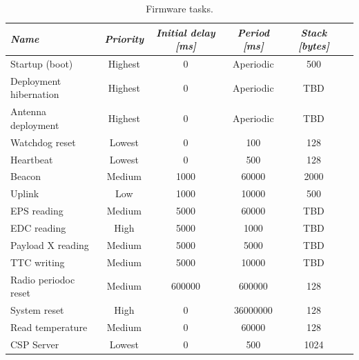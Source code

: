 \begin{table}[!h]
    \centering
    \begin{tabular}{lccccc}
        \toprule[1.5pt]
        \textit{Name}          & \textit{Priority} & \textit{Initial delay [ms]} & \textit{Period [ms]} & \textit{Stack [bytes]} \\
        \midrule
        Startup (boot)         & Highest           & 0                           & Aperiodic            & 500                    \\
        Deployment hibernation & Highest           & 0                           & Aperiodic            & TBD                    \\
        Antenna deployment     & Highest           & 0                           & Aperiodic            & TBD                    \\
        Watchdog reset         & Lowest            & 0                           & 100                  & 128                    \\
        Heartbeat              & Lowest            & 0                           & 500                  & 128                    \\
        Beacon                 & Medium            & 1000                        & 60000                & 2000                   \\
        Uplink                 & Low               & 1000                        & 10000                & 500                    \\
        EPS reading            & Medium            & 5000                        & 60000                & TBD                    \\
        EDC reading            & High              & 5000                        & 1000                 & TBD                    \\
        Payload X reading      & Medium            & 5000                        & 5000                 & TBD                    \\
        TTC writing            & Medium            & 5000                        & 10000                & TBD                    \\
        Radio periodoc reset   & Medium            & 600000                      & 600000               & 128                    \\
        System reset           & High              & 0                           & 36000000             & 128                    \\
        Read temperature       & Medium            & 0                           & 60000                & 128                    \\
        CSP Server             & Lowest            & 0                           & 500                  & 1024                   \\
        \bottomrule[1.5pt]
    \end{tabular}
    \caption{Firmware tasks.}
    \label{tab:firmware-tasks}
\end{table}

